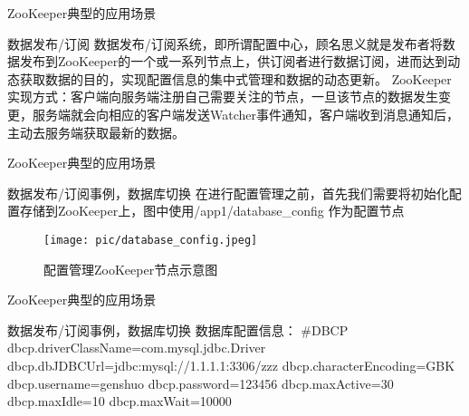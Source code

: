 \documentclass[10pt]{beamer}
\begin{document}
\begin{frame}[fragile]{ZooKeeper典型的应用场景}
  \begin{alertblock}{数据发布/订阅}
    数据发布/订阅系统，即所谓配置中心，顾名思义就是发布者将数据发布到ZooKeeper的一个或一系列节点上，供订阅者进行数据订阅，进而达到动态获取数据的目的，实现配置信息的集中式管理和数据的动态更新。\newline
    ZooKeeper实现方式：客户端向服务端注册自己需要关注的节点，一旦该节点的数据发生变更，服务端就会向相应的客户端发送Watcher事件通知，客户端收到消息通知后，主动去服务端获取最新的数据。
  \end{alertblock}
\end{frame}

\begin{frame}[fragile]{ZooKeeper典型的应用场景}
  \begin{alertblock}{数据发布/订阅事例，数据库切换}
    \newline\newline
    在进行配置管理之前，首先我们需要将初始化配置存储到ZooKeeper上，图中使用/app1/database\_config 作为配置节点
    \begin{figure}
      \texttt{[image: pic/database\_config.jpeg]}
      \caption{配置管理ZooKeeper节点示意图}
    \end{figure}
  \end{alertblock}
\end{frame}

\begin{frame}[fragile]{ZooKeeper典型的应用场景}
  \begin{alertblock}{数据发布/订阅事例，数据库切换}
    数据库配置信息：\newline
    #DBCP\newline
    dbcp.driverClassName=com.mysql.jdbc.Driver\newline
    dbcp.dbJDBCUrl=jdbc:mysql://1.1.1.1:3306/zzz\newline
    dbcp.characterEncoding=GBK\newline
    dbcp.username=genshuo\newline
    dbcp.password=123456\newline
    dbcp.maxActive=30\newline
    dbcp.maxIdle=10\newline
    dbcp.maxWait=10000
  \end{alertblock}
\end{frame}
\end{document}
